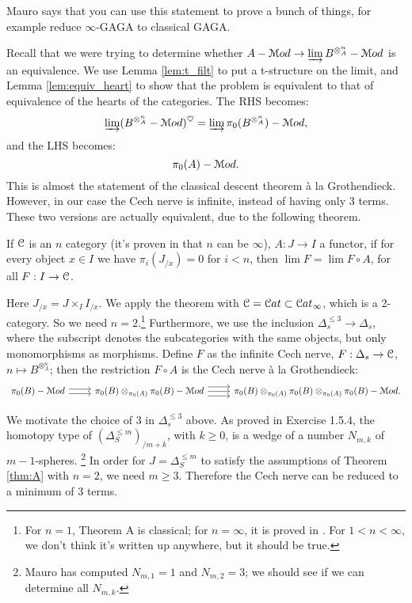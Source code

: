 \begin{rem}
Mauro says that you can use this statement to prove a bunch of things, for example reduce $\infty$-GAGA to classical GAGA.
\end{rem}

Recall that we were trying to determine whether $A-\mathcal M od \to \varinjlim B^{\otimes_A^{n}} - \mathcal M od$ is an equivalence. We use
Lemma \ref{lem:t_filt} to put a t-structure on the limit, and Lemma \ref{lem:equiv_heart} to show that the problem is equivalent
to that of equivalence of the hearts of the categories. The RHS
becomes:
\[	\varinjlim (B^{\otimes_A^{n}} - \mathcal M od)^{\heartsuit} = \varinjlim \pi_0(B^{\otimes_A^{n}}) - \mathcal M od ,	\]
and the LHS becomes:
\[	\pi_0(A)- \mathcal M od.	\]
This is almost the statement of the classical descent theorem \`{a} la Grothendieck. However, 
in our case the Cech nerve is infinite, instead of having only 3 terms. These two versions are actually
equivalent, due to the following theorem. 

\begin{thm}
\label{thm:A}
If $\mathcal C$ is an $n$ category (it's proven in \cite{HTT} that $n$ can be $\infty$), $A : J \to I$ a functor,
if for every object $x \in I$ we have $\pi_i(J_{/x}) = 0$ for $i<n$, then $\lim F = \lim F \circ A$, for all $F : I \to \mathcal C$.
\end{thm}

Here $J_{/x} = J \times_I I_{/x}$. We apply the theorem with $\mathcal C = \mathcal C at \subset \mathcal C at_{\infty}$, which is a 2-category. 
So we need $n=2$.\footnote{For $n=1$, Theorem A is classical; for $n=\infty$, it is proved in \cite{HTT}. For $1<n<\infty$,
we don't think it's written up anywhere, but it should be true.} Furthermore, we use the inclusion $\Delta_s^{\leq 3} \to
\Delta_s$, where the subscript denotes the subcategories with the same objects, but only monomorphisms as morphisms. Define
$F$ as the infinite Cech nerve, $F : \Delta_s \to \mathcal C$, $n \mapsto B^{\otimes_A^n}$; then the restriction $F \circ A$ is
the Cech nerve \`a la Grothendieck:
\[
\begin{tikzcd}
\pi_0(B) - \cM od \arrow[shift left]{r}\arrow[shift right]{r} & \pi_0(B) \otimes_{\pi_0(A)} \pi_0(B) -\cM od
\arrow[shift left = 2]{r}\arrow{r}\arrow[shift right = 2]{r} & \pi_0(B) \otimes_{\pi_0(A)} \pi_0(B) \otimes_{\pi_0(A)} \pi_0(B)
-\cM od .
\end{tikzcd}
\]


\begin{rem}
We motivate the choice of 3 in $\Delta_s^{\leq 3}$ above.
As proved in Exercise 1.5.4, the homotopy type of $(\Delta^{\leq m}_S)_{/m+k}$, with $k\geq 0$,
is a wedge of a number $N_{m,k}$ of $m-1$-spheres. \footnote{Mauro has computed $N_{m,1} = 1$ and $N_{m,2}= 3$; we should see
if we can determine all $N_{m,k}$.} In order for $J = \Delta^{\leq m}_S$ to satisfy the assumptions of Theorem \ref{thm:A} with
$n=2$, we need $m\geq 3$. Therefore the Cech nerve can be reduced to a minimum of 3 terms.
\end{rem}


